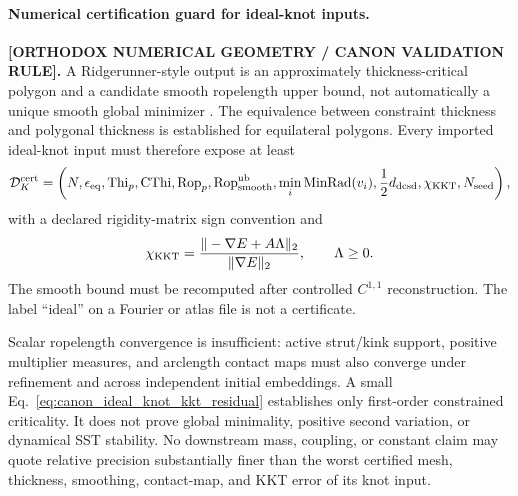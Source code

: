 \documentclass[11pt]{article}
\theoremstyle{definition}
\theoremstyle{plain}
\theoremstyle{remark}
\begin{document}
        \paragraph{Numerical certification guard for ideal-knot inputs.}
        \label{subsec:canon_ropelength_certification_guard}
        \textbf{[ORTHODOX NUMERICAL GEOMETRY / CANON VALIDATION RULE].}
        A Ridgerunner-style output is an approximately thickness-critical
        polygon and a candidate smooth ropelength upper bound, not automatically
        a unique smooth global minimizer \cite{AshtonCantarellaPiatekRawdon2011}.
        The equivalence between constraint thickness and polygonal thickness is
        established for equilateral polygons.  Every imported ideal-knot input
        must therefore expose at least
        \begin{align}
            \mathcal D_K^{\rm cert}
            =
            \left(
                N,
                \epsilon_{\rm eq},
                \operatorname{Thi}_p,
                \operatorname{CThi},
                \operatorname{Rop}_p,
                \operatorname{Rop}_{\rm smooth}^{\rm ub},
                \min_i\operatorname{MinRad}(v_i),
                \frac12d_{\rm dcsd},
                \chi_{\rm KKT},
                N_{\rm seed}
            \right),
            \label{eq:canon_ideal_knot_certification_tuple}
        \end{align}
        with a declared rigidity-matrix sign convention and
        \begin{align}
            \chi_{\rm KKT}
            =
            \frac{\|-\nabla E+A\Lambda\|_2}
                 {\|\nabla E\|_2},
            \qquad \Lambda\ge0 .
            \label{eq:canon_ideal_knot_kkt_residual}
        \end{align}
        The smooth bound must be recomputed after controlled $C^{1,1}$
        reconstruction.  The label ``ideal'' on a Fourier or atlas file is not
        a certificate.

        Scalar ropelength convergence is insufficient: active strut/kink
        support, positive multiplier measures, and arclength contact maps must
        also converge under refinement and across independent initial
        embeddings.  A small Eq.~\eqref{eq:canon_ideal_knot_kkt_residual}
        establishes only first-order constrained criticality.  It does not prove
        global minimality, positive second variation, or dynamical SST stability.
        No downstream mass, coupling, or constant claim may quote relative
        precision substantially finer than the worst certified mesh,
        thickness, smoothing, contact-map, and KKT error of its knot input.
\end{document}
